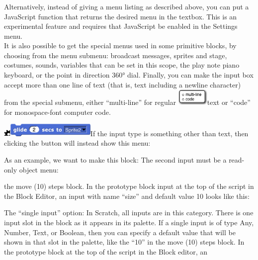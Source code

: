 \subsubsection{}\label{section-3}

Alternatively, instead of giving a menu listing as described above, you
can put a JavaScript function that returns the desired menu in the
textbox. This is an experimental feature and requires that JavaScript be
enabled in the Settings menu.\\
It is also possible to get the special menus used in some primitive
blocks, by choosing from the menu submenu: broadcast messages, sprites
and stage, costumes, sounds, variables that can be set in this scope,
the play note piano keyboard, or the point in direction 360° dial.
Finally, you can make the input box accept more than one line of text
(that is, text including a newline character) from the special submenu,
either ``multi-line'' for regular
\includegraphics[width=0.60417in,height=0.31944in]{media/image669.png}text
or ``code'' for monospace-font computer code.

\includegraphics[width=0.13056in,height=0.1375in]{media/image670.png}\includegraphics[width=1.68056in,height=0.25694in]{media/image671.png}If
the input type is something other than text, then clicking the button
will instead show this menu:

As an example, we want to make this block: The second input must be a
read-only object menu:

the move (10) steps block. In the prototype block input at the top of
the script in the Block Editor, an input with name ``size'' and default
value 10 looks like this:

The ``single input'' option: In Scratch, all inputs are in this
category. There is one input slot in the block as it appears in its
palette. If a single input is of type Any, Number, Text, or Boolean,
then you can specify a default value that will be shown in that slot in
the palette, like the ``10'' in the move (10) steps block. In the
prototype block at the top of the script in the Block editor, an

